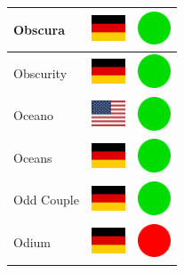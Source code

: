 \documentclass[12pt, a4paper, twoside]{report}
\begin{document}
\begin{center}
\begin{longtable}{|p{5cm}|p{2cm}|p{2cm}|}
 Obscura                                                    & \includegraphics[width=1cm]{../img/flags/de} &   \includegraphics[width=1cm]{../likes/y} \\ \hline
 Obscurity                                                  & \includegraphics[width=1cm]{../img/flags/de} &   \includegraphics[width=1cm]{../likes/y} \\ \hline
 Oceano                                                     & \includegraphics[width=1cm]{../img/flags/us} &   \includegraphics[width=1cm]{../likes/y} \\ \hline
 Oceans                                                     & \includegraphics[width=1cm]{../img/flags/de} &   \includegraphics[width=1cm]{../likes/y} \\ \hline
 Odd Couple                                                 & \includegraphics[width=1cm]{../img/flags/de} &   \includegraphics[width=1cm]{../likes/y} \\ \hline
 Odium                                                      & \includegraphics[width=1cm]{../img/flags/de} &   \includegraphics[width=1cm]{../likes/n} \\ \hline

\end{longtable}
\end{center}
\end{document}
